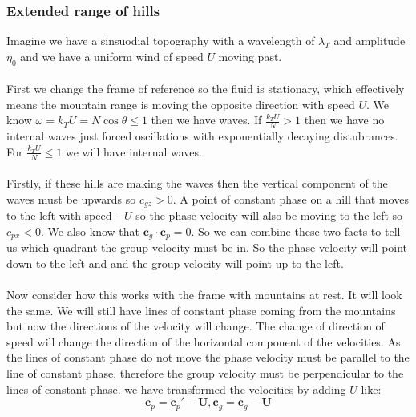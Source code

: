 \documentclass{article}
\begin{document}
\subsubsection{Extended range of hills}
Imagine we have a sinsuodial topography with a wavelength of $\lambda_T$ and amplitude $\eta_0$ and we have a uniform wind of speed $U$ moving past.\\\\
First we change the frame of reference so the fluid is stationary, which effectively means the mountain range is moving the opposite direction with speed $U$. We know $\omega = k_T U = N \cos \theta \leq 1$ then we have waves. If $\frac{k_T U }{N} >1$ then we have no internal waves just forced oscillations with exponentially decaying distubrances. For $\frac{k_T U}{N} \leq 1$ we will have internal waves.\\\\
Firstly, if these hills are making the waves then the vertical component of the waves must be upwards so $c_{gz} > 0$. A point of constant phase on a hill that moves to the left with speed $-U$ so the phase velocity will also be moving to the left so $c_{px} <0$. We also know that $\bm c_g \cdot \bm c_p = 0$. So we can combine these two facts to tell us which quadrant the group velocity must be in. So the phase velocity will point down to the left and and the group velocity will point up to the left. \\\\
Now consider how this works with the frame with mountains at rest. It will look the same. We will still have lines of constant phase coming from the mountains but now the directions of the velocity will change. The change of direction of speed will change the direction of the horizontal component of the velocities. As the lines of constant phase do not move the phase velocity must be parallel to the line of constant phase, therefore the group velocity must be perpendicular to the lines of constant phase. we have transformed the velocities by adding $U$ like:
$$
\bm c_p = \bm c_p' - \bm U, \bm c_g = \bm c_g - \bm U
$$
\end{document}
